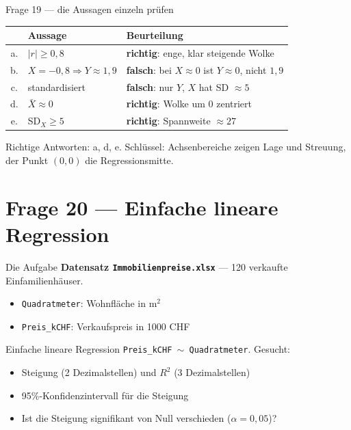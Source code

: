 \documentclass[aspectratio=169,11pt]{beamer}
\begin{document}
\begin{frame}{Frage 19 --- die Aussagen einzeln prüfen}
\renewcommand{\arraystretch}{1.3}
\centering
\begin{tabular}{clp{6.4cm}}
\toprule
 & Aussage & Beurteilung \\
\midrule
a. & $|r|\ge 0{,}8$ & \textcolor{LitmusAccent}{\textbf{richtig}}: enge, klar steigende Wolke \\
b. & $X=-0{,}8 \Rightarrow Y\approx 1{,}9$ & \textcolor{LitmusIncorrect}{\textbf{falsch}}: bei $X\approx 0$ ist $Y\approx 0$, nicht $1{,}9$ \\
c. & standardisiert & \textcolor{LitmusIncorrect}{\textbf{falsch}}: nur $Y$, $X$ hat SD $\approx 5$ \\
d. & $\bar X \approx 0$ & \textcolor{LitmusAccent}{\textbf{richtig}}: Wolke um $0$ zentriert \\
e. & SD$_X \ge 5$ & \textcolor{LitmusAccent}{\textbf{richtig}}: Spannweite $\approx 27$ \\
\bottomrule
\end{tabular}

\vspace{0.3cm}
\begin{merke}
Richtige Antworten: \alert{a, d, e}. Schlüssel: Achsenbereiche zeigen Lage
und Streuung, der Punkt $(0,0)$ die Regressionsmitte.
\end{merke}
\end{frame}

\section{Frage 20 --- Einfache lineare Regression}

\begin{frame}{Die Aufgabe}
\textbf{Datensatz \texttt{Immobilienpreise.xlsx}} --- 120 verkaufte
Einfamilienhäuser.
\begin{itemize}
  \item \texttt{Quadratmeter}: Wohnfläche in m$^2$
  \item \texttt{Preis\_kCHF}: Verkaufspreis in 1000 CHF
\end{itemize}

\vspace{0.2cm}
Einfache lineare Regression \texttt{Preis\_kCHF $\sim$ Quadratmeter}.
Gesucht:
\begin{itemize}
  \item \alert{Steigung} (2 Dezimalstellen) und \alert{$R^2$} (3 Dezimalstellen)
  \item \alert{95\%-Konfidenzintervall} für die Steigung
  \item Ist die Steigung \alert{signifikant} von Null verschieden
        ($\alpha = 0{,}05$)?
\end{itemize}
\end{frame}
\end{document}
